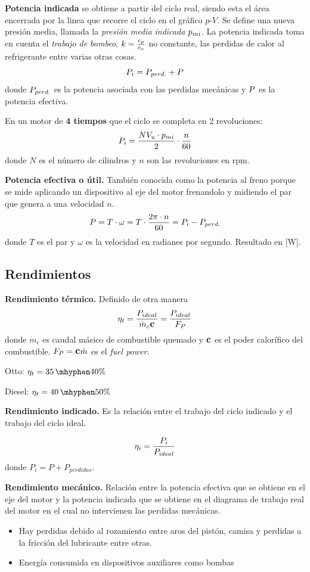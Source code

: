\textbf{Potencia indicada} se obtiene a partir del ciclo real, siendo esta el área encerrada por la linea que recorre el ciclo en el gráfico $p$-$V$. Se define una nueva presión media, llamada la \textit{presión media indicada} $p_{mi}$. La potencia indicada toma en cuenta el \textit{trabajo de bombeo}, $k=\frac{c_p}{c_v}$ no constante, las perdidas de calor al refrigerante entre varias otras cosas.
\[
P_i=P_{perd.}+P
\]
donde $P_{perd.}$ es la potencia asociada con las perdidas mecánicas y $P$ es la potencia efectiva.

En un motor de \textbf{4 tiempos} que el ciclo se completa en 2 revoluciones:
\[
P_i = \frac{N V_u \cdot p_{mi}}{2}\cdot \frac{n}{60}
\]
donde $N$ es el número de cilindros y $n$ son las revoluciones en rpm.

\textbf{Potencia efectiva o útil.} También conocida como la potencia al freno porque se mide aplicando un dispositivo al eje del motor frenandolo y midiendo el par que genera a una velocidad $n$.
\[
P=T\cdot \omega = T \cdot \frac{2\pi \cdot n}{60}=P_i-P_{perd.}
\]
donde $T$ es el par y $\omega$ es la velocidad en radianes por segundo. Resultado en [W].
\subsection{Rendimientos}
\textbf{Rendimiento térmico.} Definido de otra manera
\[
\eta_t=\frac{P_{ideal}}{\dot{m}_c \mbox{\large$\mathbf{c}$}}=\frac{P_{ideal}}{F_P}
\]
donde $\dot{m}_c$ es caudal másico de combustible quemado y $\mbox{\large$\mathbf{c}$}$ es el poder calorífico del combustible. $F_P=\mbox{\large$\mathbf{c}$} \dot{m}$ es el \emph{fuel power.}

Otto: $\eta_t=35\,\mhyphen40\%$

Diesel: $\eta_t=40\,\mhyphen50\%$


\textbf{Rendimiento indicado.} Es la relación entre el trabajo del ciclo indicado y el trabajo del ciclo ideal.

\[\eta_i=\frac{P_i}{P_{ideal}}\]
donde $P_i=P+P_{perdidas}$.


\textbf{Rendimiento mecánico.} Relación entre la potencia efectiva que se obtiene en el eje del motor y la potencia indicada que se obtiene en el diagrama de trabajo real del motor en el cual no intervienen las perdidas mecánicas.

\begin{itemize}
    \item Hay perdidas debido al rozamiento entre aros del pistón, camisa y perdidas a la fricción del lubricante entre otras.
    \item Energía consumida en dispositivos auxiliares como bombas
\end{itemize}

